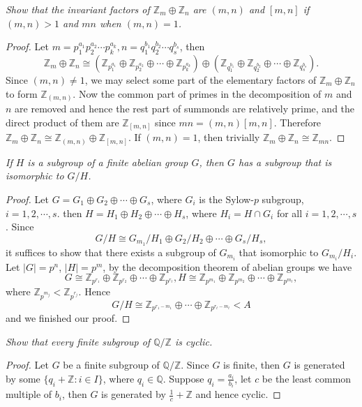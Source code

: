 \begin{problem}\em
Show that the invariant factors of $\mathbb{Z}_m\oplus\mathbb{Z}_n$ are $(m,n)$ and $[m,n]$ if $(m,n)>1$ and $mn$ when $(m,n)=1$.
\end{problem}
\begin{proof}
Let $m=p_{1}^{a_1}p_{2}^{a_2}\cdots p_{k}^{a_k},n=q_{1}^{b_1}q_{2}^{b_2}\cdots q_{s}^{b_s}$, then 
$$
\mathbb{Z} _m\oplus \mathbb{Z} _n\cong \left( \mathbb{Z} _{p_{1}^{a_1}}\oplus \mathbb{Z} _{p_{2}^{a_2}}\oplus \cdots \oplus \mathbb{Z} _{p_{k}^{a_k}} \right) \oplus \left( \mathbb{Z} _{q_{1}^{b_1}}\oplus \mathbb{Z} _{q_{2}^{b_2}}\oplus \cdots \oplus \mathbb{Z} _{q_{s}^{b_s}} \right) .
$$
Since $(m,n)\ne 1$, we may select some part of the elementary factors of $\mathbb{Z}_m\oplus\mathbb{Z}_n$ to form $\mathbb{Z}_{(m,n)}$. Now the common part of primes in the decomposition of $m$ and $n$ are removed and hence the rest part of summonds are relatively prime, and the direct product of them are $\mathbb{Z}_{[m,n]}$ since $mn=(m,n)[m,n]$. Therefore $\mathbb{Z} _m\oplus \mathbb{Z} _n\cong \mathbb{Z} _{\left( m,n \right)}\oplus \mathbb{Z} _{\left[ m,n \right]}$. If $(m,n)=1$, then trivially $\mathbb{Z}_{m}\oplus\mathbb{Z}_n\cong\mathbb{Z}_{mn}$.
\end{proof}
\begin{problem}\em
If $H$ is a subgroup of a finite abelian group $G$, then $G$ has a subgroup that is isomorphic to $G/H$.
\end{problem}
\begin{proof}
Let $G=G_1\oplus G_2\oplus\cdots\oplus G_s$, where $G_i$ is the Sylow-$p$ subgroup, $i=1,2,\cdots,s$. then $H=H_1\oplus H_2\oplus\cdots\oplus H_s$, where $H_i=H\cap G_i$ for all $i=1,2,\cdots,s$. Since 
$$G/H\cong G_{m_1}/H_1\oplus G_2/H_2\oplus\cdots\oplus G_{s}/H_s,$$
it suffices to show that there exists a subgroup of $G_{m_i}$ that isomorphic to $G_{m_i}/H_i$. Let $|G|=p^n$, $|H|=p^m$, by the decomposition theorem of abelian groups we have 
$$G\cong\mathbb{Z}_{p^{r_1}}\oplus\mathbb{Z}_{p^{r_2}}\oplus\cdots\oplus\mathbb{Z}_{p^{r_t}},H\cong\mathbb{Z}_{p^{m_1}}\oplus\mathbb{Z}_{p^{m_2}}\oplus\cdots\oplus\mathbb{Z}_{p^{m_t}},$$
where $\mathbb{Z}_{p^{m_j}}<\mathbb{Z}_{p^{r_j}}$. Hence 
$$G/H\cong\mathbb{Z}_{p^{r_1-m_1}}\oplus\cdots\oplus\mathbb{Z}_{p^{r_t-m_t}}<A$$
and we finished our proof.
\end{proof}
\begin{problem}\em
Show that every finite subgroup of $\mathbb{Q}/\mathbb{Z}$ is cyclic.
\end{problem}
\begin{proof}
Let $G$ be a finite subgroup of $\mathbb{Q}/\mathbb{Z}$. Since $G$ is finite, then $G$ is generated by some $\{q_i+\mathbb{Z}:i\in I\}$, where $q_i\in\mathbb{Q}$. Suppose $q_i=\frac{a_i}{b_i}$, let $c$ be the least common multiple of $b_i$, then $G$ is generated by $\frac{1}{c}+\mathbb{Z}$ and hence cyclic.
\end{proof}
